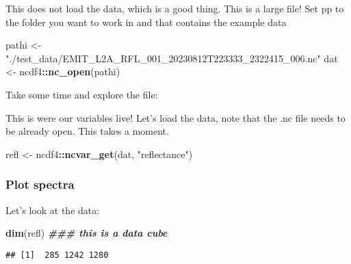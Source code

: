 \documentclass[
]{article}
\newenvironment{Shaded}{\begin{snugshade}}{\end{snugshade}}
\newcommand{\DocumentationTok}[1]{\textcolor[rgb]{0.56,0.35,0.01}{\textbf{\textit{#1}}}}
\newcommand{\FunctionTok}[1]{\textcolor[rgb]{0.13,0.29,0.53}{\textbf{#1}}}
\newcommand{\NormalTok}[1]{#1}
\newcommand{\OtherTok}[1]{\textcolor[rgb]{0.56,0.35,0.01}{#1}}
\newcommand{\SpecialCharTok}[1]{\textcolor[rgb]{0.81,0.36,0.00}{\textbf{#1}}}
\newcommand{\StringTok}[1]{\textcolor[rgb]{0.31,0.60,0.02}{#1}}
\begin{document}
This does not load the data, which is a good thing. This is a large
file! Set pp to the folder you want to work in and that contains the
example data

\begin{Shaded}
\begin{Highlighting}[]
\NormalTok{pathi }\OtherTok{\textless{}{-}} \StringTok{"./test\_data/EMIT\_L2A\_RFL\_001\_20230812T223333\_2322415\_006.nc"}
\NormalTok{dat }\OtherTok{\textless{}{-}}\NormalTok{ ncdf4}\SpecialCharTok{::}\FunctionTok{nc\_open}\NormalTok{(pathi) }
\end{Highlighting}
\end{Shaded}

Take some time and explore the file:

\begin{Shaded}
\end{Shaded}

This is were our variables live! Let's load the data, note that the .nc
file needs to be already open. This takes a moment.

\begin{Shaded}
\begin{Highlighting}[]
\NormalTok{refl }\OtherTok{\textless{}{-}}\NormalTok{ ncdf4}\SpecialCharTok{::}\FunctionTok{ncvar\_get}\NormalTok{(dat, }\StringTok{"reflectance"}\NormalTok{)}
\end{Highlighting}
\end{Shaded}

\hypertarget{plot-spectra}{%
\subsubsection{Plot spectra}\label{plot-spectra}}

Let's look at the data:

\begin{Shaded}
\begin{Highlighting}[]
\FunctionTok{dim}\NormalTok{(refl) }\DocumentationTok{\#\#\# this is a data cube}
\end{Highlighting}
\end{Shaded}

\begin{verbatim}
## [1]  285 1242 1280
\end{verbatim}
\end{document}
